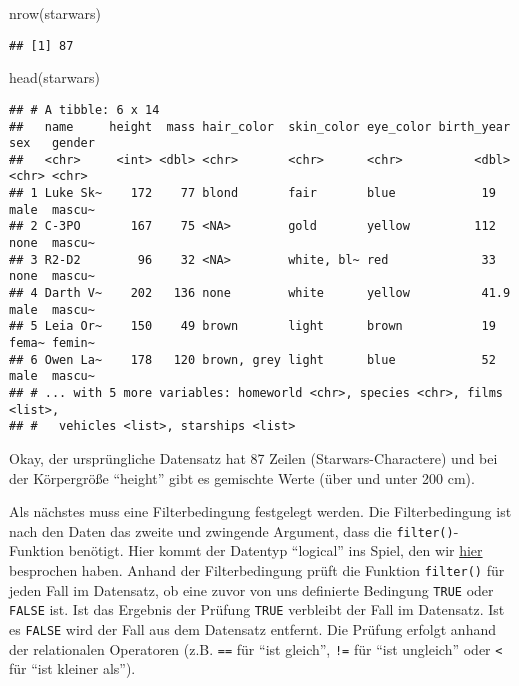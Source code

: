 \documentclass[
]{book}
\newenvironment{Shaded}{\begin{snugshade}}{\end{snugshade}}
\newcommand{\FunctionTok}[1]{\textcolor[rgb]{0.00,0.00,0.00}{#1}}
\newcommand{\NormalTok}[1]{#1}
\begin{document}
\begin{Shaded}
\begin{Highlighting}[]
\FunctionTok{nrow}\NormalTok{(starwars)}
\end{Highlighting}
\end{Shaded}

\begin{verbatim}
## [1] 87
\end{verbatim}

\begin{Shaded}
\begin{Highlighting}[]
\FunctionTok{head}\NormalTok{(starwars)}
\end{Highlighting}
\end{Shaded}

\begin{verbatim}
## # A tibble: 6 x 14
##   name     height  mass hair_color  skin_color eye_color birth_year sex   gender
##   <chr>     <int> <dbl> <chr>       <chr>      <chr>          <dbl> <chr> <chr> 
## 1 Luke Sk~    172    77 blond       fair       blue            19   male  mascu~
## 2 C-3PO       167    75 <NA>        gold       yellow         112   none  mascu~
## 3 R2-D2        96    32 <NA>        white, bl~ red             33   none  mascu~
## 4 Darth V~    202   136 none        white      yellow          41.9 male  mascu~
## 5 Leia Or~    150    49 brown       light      brown           19   fema~ femin~
## 6 Owen La~    178   120 brown, grey light      blue            52   male  mascu~
## # ... with 5 more variables: homeworld <chr>, species <chr>, films <list>,
## #   vehicles <list>, starships <list>
\end{verbatim}

Okay, der ursprüngliche Datensatz hat 87 Zeilen (Starwars-Charactere) und bei der Körpergröße ``height'' gibt es gemischte Werte (über und unter 200 cm).

Als nächstes muss eine Filterbedingung festgelegt werden. Die Filterbedingung ist nach den Daten das zweite und zwingende Argument, dass die \texttt{filter()}-Funktion benötigt. Hier kommt der Datentyp ``logical'' ins Spiel, den wir \protect\hyperlink{atomic_vector_types}{hier} besprochen haben. Anhand der Filterbedingung prüft die Funktion \texttt{filter()} für jeden Fall im Datensatz, ob eine zuvor von uns definierte Bedingung \texttt{TRUE} oder \texttt{FALSE} ist. Ist das Ergebnis der Prüfung \texttt{TRUE} verbleibt der Fall im Datensatz. Ist es \texttt{FALSE} wird der Fall aus dem Datensatz entfernt. Die Prüfung erfolgt anhand der relationalen Operatoren (z.B. \texttt{==} für ``ist gleich'', \texttt{!=} für ``ist ungleich'' oder \texttt{\textless{}} für ``ist kleiner als'').
\end{document}

